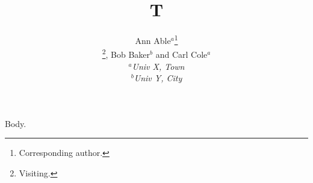 \documentclass{article}
\begin{document}
\title{T}
\author{Ann Able$^{a}$\thanks{Corresponding author.}\addtocounter{footnote}{-1}\thanks{Visiting.}, Bob Baker$^{b}$ and Carl Cole$^{a}$ \\\vspace{6pt}
\vspace{3pt} $^{a}${\em{Univ X, Town}}\\
\vspace{3pt} $^{b}${\em{Univ Y, City}}}
\maketitle
Body.
\end{document}
